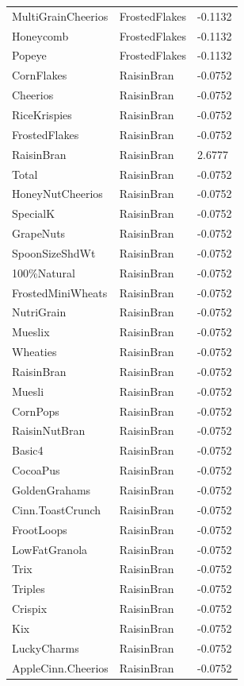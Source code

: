 \begin{table}[!htbp]
\begin{tabular}{lll}
\\
MultiGrainCheerios & FrostedFlakes & -0.1132
\\
Honeycomb & FrostedFlakes & -0.1132
\\
Popeye & FrostedFlakes & -0.1132
\\
CornFlakes & RaisinBran & -0.0752
\\
Cheerios & RaisinBran & -0.0752
\\
RiceKrispies & RaisinBran & -0.0752
\\
FrostedFlakes & RaisinBran & -0.0752
\\
RaisinBran & RaisinBran & 2.6777
\\
Total & RaisinBran & -0.0752
\\
HoneyNutCheerios & RaisinBran & -0.0752
\\
SpecialK & RaisinBran & -0.0752
\\
GrapeNuts & RaisinBran & -0.0752
\\
SpoonSizeShdWt & RaisinBran & -0.0752
\\
100\%Natural & RaisinBran & -0.0752
\\
FrostedMiniWheats & RaisinBran & -0.0752
\\
NutriGrain & RaisinBran & -0.0752
\\
Mueslix & RaisinBran & -0.0752
\\
Wheaties & RaisinBran & -0.0752
\\
RaisinBran & RaisinBran & -0.0752
\\
Muesli & RaisinBran & -0.0752
\\
CornPops & RaisinBran & -0.0752
\\
RaisinNutBran & RaisinBran & -0.0752
\\
Basic4 & RaisinBran & -0.0752
\\
CocoaPus & RaisinBran & -0.0752
\\
GoldenGrahams & RaisinBran & -0.0752
\\
Cinn.ToastCrunch & RaisinBran & -0.0752
\\
FrootLoops & RaisinBran & -0.0752
\\
LowFatGranola & RaisinBran & -0.0752
\\
Trix & RaisinBran & -0.0752
\\
Triples & RaisinBran & -0.0752
\\
Crispix & RaisinBran & -0.0752
\\
Kix & RaisinBran & -0.0752
\\
LuckyCharms & RaisinBran & -0.0752
\\
AppleCinn.Cheerios & RaisinBran & -0.0752

\end{tabular}
\end{table}
